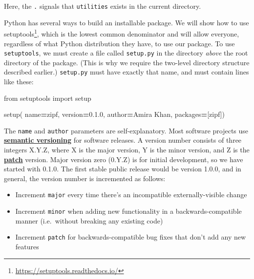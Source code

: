 \documentclass[
]{krantz}
\makeatletter
\newenvironment{Shaded}{\begin{snugshade}}{\end{snugshade}}
\newcommand{\ImportTok}[1]{#1}
\newcommand{\NormalTok}[1]{#1}
\newcommand{\OperatorTok}[1]{\textcolor[rgb]{0.81,0.36,0.00}{\textbf{#1}}}
\newcommand{\StringTok}[1]{\textcolor[rgb]{0.31,0.60,0.02}{#1}}
\providecommand{\tightlist}{%
  \setlength{\itemsep}{0pt}\setlength{\parskip}{0pt}}
\renewcommand{\href}[2]{#2\footnote{\url{#1}}}
\newenvironment{kframe}{%
\medskip{}
\setlength{\fboxsep}{.8em}
 \def\at@end@of@kframe{}%
 \ifinner\ifhmode%
  \def\at@end@of@kframe{\end{minipage}}%
  \begin{minipage}{\columnwidth}%
 \fi\fi%
 \def\FrameCommand##1{\hskip\@totalleftmargin \hskip-\fboxsep
 \colorbox{shadecolor}{##1}\hskip-\fboxsep
     \hskip-\linewidth \hskip-\@totalleftmargin \hskip\columnwidth}%
 \MakeFramed {\advance\hsize-\width
   \@totalleftmargin\z@ \linewidth\hsize
   \@setminipage}}%
 {\par\unskip\endMakeFramed%
 \at@end@of@kframe}
\renewenvironment{Shaded}{\begin{kframe}}{\end{kframe}}
\newcommand{\gref}[2]{\hyperlink{#2}{\textbf{#1}}}
\makeatother
\begin{document}
Here,
the \texttt{.} signals that \texttt{utilities} exists in the current directory.

Python has several ways to build an installable package.
We will show how to use \href{https://setuptools.readthedocs.io/}{setuptools},
which is the lowest common denominator
and will allow everyone,
regardless of what Python distribution they have,
to use our package.
To use \texttt{setuptools},
we must create a file called \texttt{setup.py} in the directory \emph{above} the root directory of the package.
(This is why we require the two-level directory structure described earlier.)
\texttt{setup.py} must have exactly that name,
and must contain lines like these:

\begin{Shaded}
\begin{Highlighting}[]
\ImportTok{from}\NormalTok{ setuptools }\ImportTok{import}\NormalTok{ setup}


\NormalTok{setup(}
\NormalTok{    name}\OperatorTok{=}\StringTok{\textquotesingle{}zipf\textquotesingle{}}\NormalTok{,}
\NormalTok{    version}\OperatorTok{=}\StringTok{\textquotesingle{}0.1.0\textquotesingle{}}\NormalTok{,}
\NormalTok{    author}\OperatorTok{=}\StringTok{\textquotesingle{}Amira Khan\textquotesingle{}}\NormalTok{,}
\NormalTok{    packages}\OperatorTok{=}\NormalTok{[}\StringTok{\textquotesingle{}zipf\textquotesingle{}}\NormalTok{])}
\end{Highlighting}
\end{Shaded}

The \texttt{name} and \texttt{author} parameters are self-explanatory.
Most software projects use \gref{semantic versioning}{semantic\_versioning}
for software releases.
A version number consists of three integers X.Y.Z,
where X is the major version,
Y is the minor version,
and Z is the \gref{patch}{patch} version.
Major version zero (0.Y.Z) is for initial development, so we have started with 0.1.0.
The first stable public release would be version 1.0.0,
and in general, the version number is incremented as follows:

\begin{itemize}
\tightlist
\item
  Increment \texttt{major} every time there's an incompatible externally-visible change
\item
  Increment \texttt{minor} when adding new functionality in a backwards-compatible manner
  (i.e.~without breaking any existing code)
\item
  Increment \texttt{patch} for backwards-compatible bug fixes that don't add any new features
\end{itemize}
\end{document}
